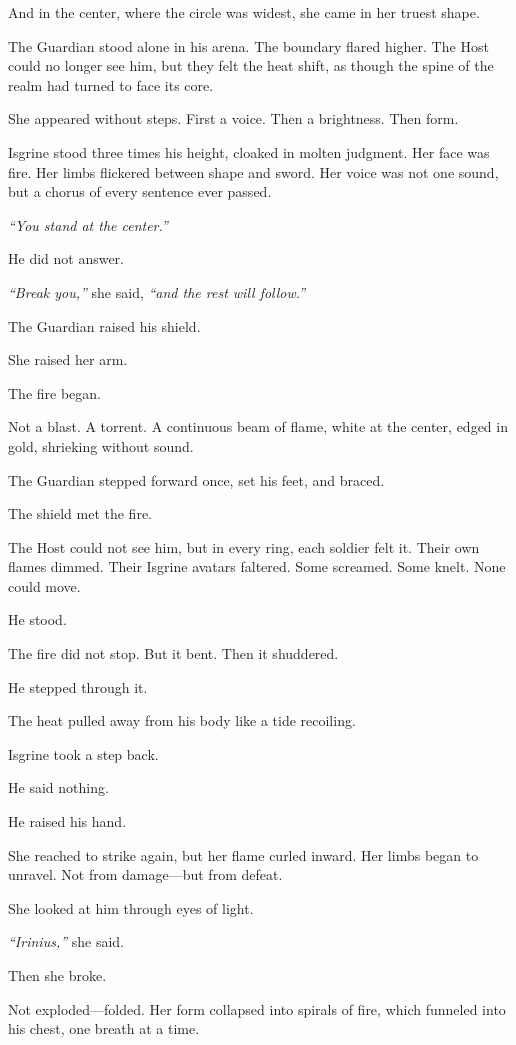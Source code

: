 \documentclass[9pt]{article}
\begin{document}
And in the center, where the circle was widest, she came in her truest shape.

The Guardian stood alone in his arena. The boundary flared higher. The Host could no longer see him, but they felt the heat shift, as though the spine of the realm had turned to face its core.

She appeared without steps. First a voice. Then a brightness. Then form.

Isgrine stood three times his height, cloaked in molten judgment. Her face was fire. Her limbs flickered between shape and sword. Her voice was not one sound, but a chorus of every sentence ever passed.

\textit{``You stand at the center.''}

He did not answer.

\textit{``Break you,''} she said, \textit{``and the rest will follow.''}

The Guardian raised his shield.

She raised her arm.

The fire began.

Not a blast. A torrent. A continuous beam of flame, white at the center, edged in gold, shrieking without sound.

The Guardian stepped forward once, set his feet, and braced.

The shield met the fire.

The Host could not see him, but in every ring, each soldier felt it. Their own flames dimmed. Their Isgrine avatars faltered. Some screamed. Some knelt. None could move.

He stood.

The fire did not stop. But it bent. Then it shuddered.

He stepped through it.

The heat pulled away from his body like a tide recoiling.

Isgrine took a step back.

He said nothing.

He raised his hand.

She reached to strike again, but her flame curled inward. Her limbs began to unravel. Not from damage—but from defeat.

She looked at him through eyes of light.

\textit{``Irinius,''} she said.

Then she broke.

Not exploded—folded. Her form collapsed into spirals of fire, which funneled into his chest, one breath at a time.
\end{document}
